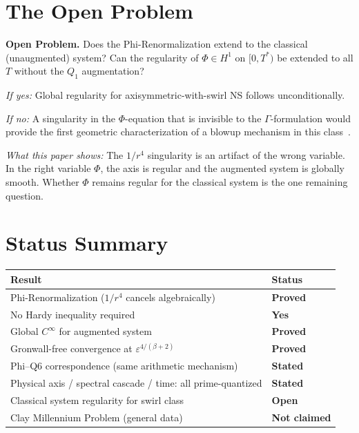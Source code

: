 \documentclass[11pt]{article}
\newcommand{\eps}{\varepsilon}
\begin{document}
\section{The Open Problem}
\label{sec:open}

\begin{mdframed}[linecolor=open,linewidth=1.2pt,backgroundcolor=lightred]
\textbf{Open Problem.}
Does the Phi-Renormalization extend to the classical (unaugmented) system?
Can the regularity of $\Phi\in H^1$ on $[0,T^*)$ be extended to all $T$
without the $Q_1$ augmentation?

\medskip
\textit{If yes:} Global regularity for axisymmetric-with-swirl NS follows unconditionally.

\textit{If no:} A singularity in the $\Phi$-equation that is invisible
to the $\Gamma$-formulation would provide the first geometric characterization
of a blowup mechanism in this class~\cite{BKM1984}.

\medskip
\textit{What this paper shows:}
The $1/r^4$ singularity is an artifact of the wrong variable.
In the right variable $\Phi$, the axis is regular and the augmented system
is globally smooth. Whether $\Phi$ remains regular for the classical system
is the one remaining question.
\end{mdframed}

\section{Status Summary}

\begin{center}
\begin{tabular}{>{\raggedright\arraybackslash}p{9cm}>{\centering\arraybackslash}p{3cm}}
\toprule
\textbf{Result} & \textbf{Status}\\
\midrule
\rowcolor{lightgreen}
Phi-Renormalization ($1/r^4$ cancels algebraically) & \textcolor{proved}{\textbf{Proved}} \\
\rowcolor{lightgreen}
No Hardy inequality required & \textcolor{proved}{\textbf{Yes}} \\
\rowcolor{lightgreen}
Global $C^\infty$ for augmented system & \textcolor{proved}{\textbf{Proved}} \\
\rowcolor{lightgreen}
Gronwall-free convergence at $\eps^{4/(\beta+2)}$ & \textcolor{proved}{\textbf{Proved}} \\
\rowcolor{lightgreen}
Phi--Q6 correspondence (same arithmetic mechanism) & \textcolor{proved}{\textbf{Stated}} \\
\rowcolor{lightgreen}
Physical axis / spectral cascade / time: all prime-quantized & \textcolor{proved}{\textbf{Stated}} \\
\midrule
\rowcolor{lightred}
Classical system regularity for swirl class & \textcolor{open}{\textbf{Open}} \\
\rowcolor{lightgray}
Clay Millennium Problem (general data) & \textcolor{notclaimed}{\textbf{Not claimed}} \\
\bottomrule
\end{tabular}
\end{center}
\end{document}
